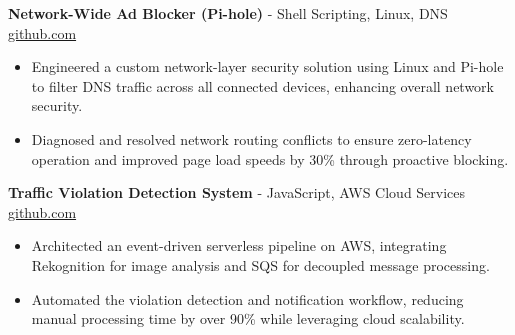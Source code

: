 \documentclass[11pt]{article}       %
\begin{document}
\textbf{Network-Wide Ad Blocker (Pi-hole)}{ - Shell Scripting, Linux, DNS} \hfill \href{https://github.com/Monica20030707}{github.com} \\
\vspace{-9pt}
\begin{itemize}
  \item Engineered a custom network-layer security solution using Linux and Pi-hole to filter DNS traffic across all connected devices, enhancing overall network security.
  \item Diagnosed and resolved network routing conflicts to ensure zero-latency operation and improved page load speeds by 30\% through proactive blocking.
\end{itemize}

\textbf{Traffic Violation Detection System}{ - JavaScript, AWS Cloud Services} \hfill \href{https://github.com/Monica20030707/AWS_rekonigition-N-read-database}{github.com} \\
\vspace{-9pt}
\begin{itemize}
  \item Architected an event-driven serverless pipeline on AWS, integrating Rekognition for image analysis and SQS for decoupled message processing.
  \item Automated the violation detection and notification workflow, reducing manual processing time by over 90\% while leveraging cloud scalability.
\end{itemize}
\end{document}
